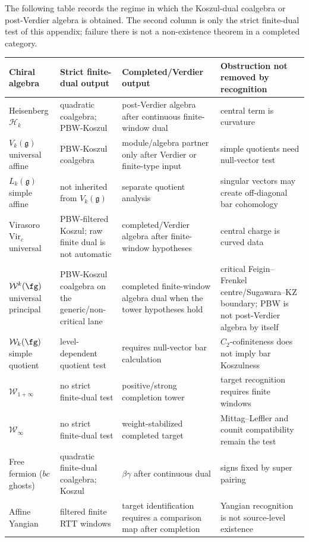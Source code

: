 \begin{proposition}\label{prop:classification-table}
The following table records the regime in which the Koszul-dual
coalgebra or post-Verdier algebra is obtained. The second column is
only the strict finite-dual test of this appendix; failure there is
not a non-existence theorem in a completed category.

\begin{center}
\small
\begin{tabular}{|p{}|p{}|p{}|p{}|}
\hline
\textbf{Chiral algebra} & \textbf{Strict finite-dual output} & \textbf{Completed/Verdier output} & \textbf{Obstruction not removed by recognition} \\
\hline
Heisenberg $\mathcal{H}_k$ & quadratic coalgebra; PBW-Koszul & post-Verdier algebra after continuous finite-window dual & central term is curvature \\
\hline
$V_k(\mathfrak{g})$ universal affine & PBW-Koszul coalgebra & module/algebra partner only after Verdier or finite-type input & simple quotients need null-vector test \\
\hline
$L_k(\mathfrak{g})$ simple affine & not inherited from $V_k(\mathfrak g)$ & separate quotient analysis & singular vectors may create off-diagonal bar cohomology \\
\hline
Virasoro $\mathrm{Vir}_c$ universal & PBW-filtered Koszul; raw finite dual is not automatic & completed/Verdier algebra after finite-window hypotheses & central charge is curved data \\
\hline
$\mathcal{W}^k(\fg)$ universal principal & PBW-Koszul coalgebra on the generic/non-critical lane & completed finite-window algebra dual when the tower hypotheses hold & critical Feigin--Frenkel centre/Sugawara--KZ boundary; PBW is not post-Verdier algebra by itself \\
\hline
$\mathcal{W}_k(\fg)$ simple quotient & level-dependent quotient test & requires null-vector bar calculation & $C_2$-cofiniteness does not imply bar Koszulness \\
\hline
$\mathcal{W}_{1+\infty}$ & no strict finite-dual test & positive/strong completion tower & target recognition requires finite windows \\
\hline
$\mathcal{W}_\infty$ & no strict finite-dual test & weight-stabilized completed target & Mittag--Leffler and counit compatibility remain the test \\
\hline
Free fermion ($bc$ ghosts) & quadratic finite-dual coalgebra; Koszul & $\beta\gamma$ after continuous dual & signs fixed by super pairing \\
\hline
Affine Yangian & filtered finite RTT windows & target identification requires a comparison map after completion & Yangian recognition is not source-level existence \\
\hline
\end{tabular}
\end{center}
\end{proposition}

